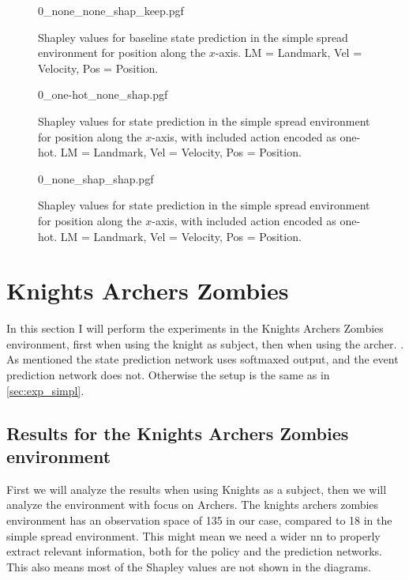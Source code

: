 \documentclass[UKenglish]{uiomasterthesis}
\begin{document}
\begin{figure}[H]
    \centering
{0_none_none_shap_keep.pgf}
\caption{Shapley values for baseline state prediction in the simple spread environment for position along the $x$-axis. LM = Landmark, Vel = Velocity, Pos = Position.}
\label{fig:state_simpl_shap}
\end{figure}

\begin{figure}[H]
\centering
{0_one-hot_none_shap.pgf}
\caption{Shapley values for state prediction in the simple spread environment for position along the $x$-axis, with included action encoded as one-hot. LM = Landmark, Vel = Velocity, Pos = Position.}
\label{fig:state_simpl_one-hot}
\end{figure}

\begin{figure}[H]
\centering
{0_none_shap_shap.pgf}
\caption{Shapley values for state prediction in the simple spread environment for position along the $x$-axis, with included action encoded as one-hot. LM = Landmark, Vel = Velocity, Pos = Position.}
\label{fig:state_simpl_shap_shap}
\end{figure}

\section{Knights Archers Zombies}
In this section I will perform the experiments in the Knights Archers Zombies environment, first when using the knight as subject, then when using the archer.
\label{sec:exp_kaz}. As mentioned the state prediction network uses softmaxed output, and the event prediction network does not. Otherwise the setup is the same as in \cref{sec:exp_simpl}.

\subsection{Results for the Knights Archers Zombies environment}
First we will analyze the results when using Knights as a subject, then we will analyze the environment with focus on Archers. The knights archers zombies environment has an observation space of 135 in our case, compared to 18 in the simple spread environment. This might mean we need a wider \ac{nn} to properly extract relevant information, both for the policy and the prediction networks. This also means most of the Shapley values are not shown in the diagrams.
\end{document}
